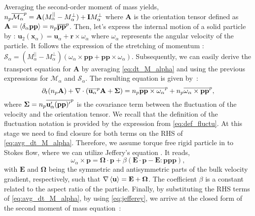 Averaging the second-order moment of mass yields, $n_p\overline{\mathcal{M}_\alpha}^{p} =  \textbf{A} (M_\alpha^{||} - M_\alpha^\bot) +  \textbf{I} M_\alpha^\bot$ where $\textbf{A}$ is the orientation tensor defined as $\textbf{A} = \left<\delta_\alpha\textbf{pp}\right> = n_p\overline{\textbf{pp}}^{p}$.
Then, let's express the internal motion of a solid particle by : $\textbf{u}_2(\textbf{x}_\alpha) = \textbf{u}_\alpha + \textbf{r}\times \omega_\alpha$ where $\omega_\alpha$ represents the angular velocity of the particle.
It follows the expression of the stretching of momentum : $\mathcal{S}_\alpha = (M_\alpha^{||} - M_\alpha^\bot) \left(
    \omega_\alpha \times
    \textbf{pp}
    + \textbf{pp} \times \omega_\alpha
\right)$. 
Subsequently,  we can easily derive the transport equation for $\textbf{A}$ by averaging \ref{eq:dt_M_alpha} and using the previous expressions for $\mathcal{M}_\alpha$ and $\mathcal{S}_\alpha$.
The resulting equation is given by~:
\begin{equation}
    \partial_t (n_p\textbf{A})
    + \mathbf{\nabla} \cdot (
        \overline{\textbf{u}_\alpha}^{p}\textbf{A}
        + \mathbf{\Sigma}
        )
    =
    n_p\overline{\textbf{pp} \times \omega_\alpha}^{p}
    + n_p\overline{\omega_\alpha \times \textbf{pp}}^{p},
    \label{eq:avg_dt_M_alpha}
\end{equation}
where $\mathbf{\Sigma} = n_p\overline{\textbf{u}'_\alpha(\textbf{pp})'}^{p}$ is the covariance term between the fluctuation of the velocity and the orientation tensor.
We recall that the definition of the fluctuation notation is provided by the expression from \ref{eq:def_fluctu}.
At this stage we need to find closure for both terms on the RHS of \ref{eq:avg_dt_M_alpha}. 
Therefore, we assume torque free rigid particle in to Stokes flow, where we can utilize Jeffery's equation \citep{guazzelli2011}.
It reads,
\begin{equation}
    \omega_\alpha \times \textbf{p}
    = \mathbf{\Omega}\cdot\textbf{p}
    + \beta\left(
        \textbf{E}\cdot \textbf{p}
        - \textbf{E} : \textbf{ppp}
    \right),
    \label{eq:jefferey}
\end{equation}
with $\textbf{E}$ and $\mathbf{\Omega}$ being the symmetric and antisymmetric parts of the bulk velocity gradient, respectively, such that $\mathbf{\nabla}\left<\textbf{u}\right>=\textbf{E}+\mathbf{\Omega}$.
The coefficient $\beta$  is a constant related to the aspect ratio of the particle.
Finally, by substituting the RHS terms of \ref{eq:avg_dt_M_alpha}, by using \ref{eq:jefferey}, we arrive at the closed form of the second moment of mass equation~:
